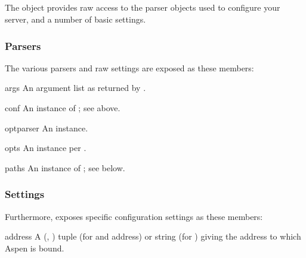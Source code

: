 \subsection{}
\label{api-configuration}

The  object provides raw access to the parser objects
used to configure your server, and a number of basic settings.

\subsubsection{Parsers}

The various parsers and raw settings are exposed as these members:

\begin{memberdesc}[list]{args}
An argument list as returned by .
\end{memberdesc}

\begin{memberdesc}[ConfFile]{conf}
An instance of ; see above.
\end{memberdesc}

\begin{memberdesc}[OptionParser]{optparser}
An  instance.
\end{memberdesc}

\begin{memberdesc}[Values]{opts}
An  instance per .
\end{memberdesc}

\begin{memberdesc}[Paths]{paths}
An instance of ; see below.
\end{memberdesc}


\subsubsection{Settings}

Furthermore,  exposes specific configuration settings
as these members:

\begin{memberdesc}[]{address}
A (, ) tuple (for  and 
address) or string (for ) giving the address to which Aspen is
bound.
\end{memberdesc}

